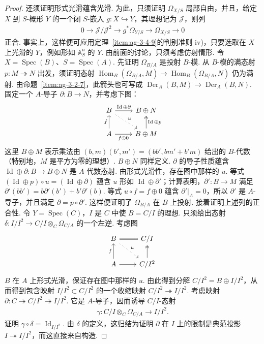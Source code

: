 \begin{proof}
还须证明形式光滑蕴含光滑. 为此，只须证明 $\Omega_{X/S}$ 局部自由，并且，给定 $X$ 到 $S$-概形 $Y$ 的一个闭 $S$-嵌入 $g:X\hookrightarrow Y$，其理想记为 $\mathcal J$，则列
\begin{align*}
0\longrightarrow\mathcal J/\mathcal J^2\longrightarrow g^*\Omega_{Y/S}\longrightarrow\Omega_{X/S}\longrightarrow0
\end{align*}
正合. 事实上，这样便可应用定理~\ref{item:ag-3-4-9}的判别准则 iv)，只要选取在 $X$ 上光滑的 $Y$，例如形如 $\mathbb A_S^n$ 的 $Y$.
由前面的讨论，只须考虑仿射情形. 令 $X=\operatorname{Spec}(B)$、$S=\operatorname{Spec}(A)$. 先证明 $\Omega_{B/A}$ 是投射 $B$-模. 从 $B$-模的满态射 $p:M\twoheadrightarrow N$ 出发，须证明态射 $\operatorname{Hom}_B(\Omega_{B/A},M)\longrightarrow\operatorname{Hom}_B(\Omega_{B/A},N)$ 仍为满射. 由命题~\ref{item:ag-3-2-7}，此箭头也可写成 $\operatorname{Der}_A(B,M)\longrightarrow\operatorname{Der}_A(B,N)$. 固定一个 $A$-导子 $\partial:B\longrightarrow N$，并考虑下图：
\begin{align*}
\begin{tikzcd}[ampersand replacement=\&]
B\arrow[r,"\operatorname{Id}\oplus\partial"]\arrow[dr,dotted,"u"] \& B\oplus N\\
A\arrow[u,"f"]\arrow[r,"f\oplus0"'] \& B\oplus M\arrow[u,two heads,"\operatorname{Id}\oplus p"']
\end{tikzcd}
\end{align*}
这里 $B\oplus M$ 表示乘法由 $(b,m)(b',m')=(bb',bm'+b'm)$ 给出的 $B$-代数（特别地，$M$ 是平方为零的理想）. $B\oplus N$ 同样定义. $\partial$ 的导子性质蕴含 $\operatorname{Id}\oplus\partial:B\longrightarrow B\oplus N$ 是 $A$-代数态射. 由形式光滑性，存在图中那样的 $u$. 等式 $(\operatorname{Id}\oplus p)\circ u=(\operatorname{Id}\oplus\partial)$ 蕴含 $u$ 形如 $\operatorname{Id}\oplus\partial'$；计算表明，$\partial':B\longrightarrow M$ 满足 $\partial'(bb')=b\partial'(b')+b'\partial'(b)$. 等式 $u\circ f=f\oplus0$ 蕴含 $\partial'|_A=0$，所以 $\partial'$ 是 $A$-导子，并且满足 $\partial=p\circ\partial'$. 这样便证明了 $\Omega_{B/A}$ 在 $B$ 上投射.
接着证明上述列的正合性. 令 $Y=\operatorname{Spec}(C)$，$I$ 是 $C$ 中使 $B=C/I$ 的理想. 只须给出态射 $\delta:I/I^2\longrightarrow C/I\otimes_C\Omega_{C/A}$ 的一个左逆. 考虑图
\begin{align*}
\begin{tikzcd}[ampersand replacement=\&]
B\arrow[r,equal]\arrow[dr,dotted,"u"] \& C/I\\
A\arrow[u,"f"]\arrow[r] \& C/I^2\arrow[u,two heads]
\end{tikzcd}
\end{align*}
$B$ 在 $A$ 上形式光滑，保证存在图中那样的 $u$. 由此得到分解 $C/I^2=B\oplus I/I^2$，从而得到包含映射
$I/I^2\subset C/I^2$ 的一个收缩映射 $C/I^2\twoheadrightarrow I/I^2$. 考虑映射 $\partial:C\twoheadrightarrow C/I^2\twoheadrightarrow I/I^2$. 它是 $A$-导子，因而诱导 $C/I$-态射
\begin{align*}
\gamma:C/I\otimes_C\Omega_{C/A}\longrightarrow I/I^2.
\end{align*}
证明 $\gamma\circ\delta=\operatorname{Id}_{I/I^2}$. 由 $\delta$ 的定义，这归结为证明 $\partial$ 在 $I$ 上的限制是典范投影 $I\twoheadrightarrow I/I^2$，而这直接来自构造.
\end{proof}
